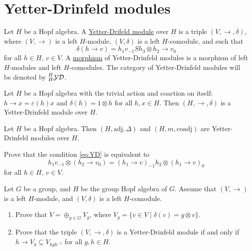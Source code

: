 \section{Yetter-Drinfeld modules}

\begin{definition}
Let $H$ be a Hopf algebra. A \underline{Yetter-Drifeld module} over $H$ is a
triple $(V,\rightarrow,\delta)$, where $(V,\rightarrow)$ is a left $H$-module,
$(V,\delta)$ is a left $H$-comodule, and such that 
\begin{equation}
\delta(h\rightarrow v)=h_{1}v_{-1}Sh_{3}\otimes h_{2}\rightarrow v_{0}\label{eq:YD}
\end{equation}
for all $h\in H$, $v\in V$. A \underline{morphism} of Yetter-Drinfeld modules
is a morphism of left $H$-modules and left $H$-comodules. The category of Yetter-Drinfeld
modules will be denoted by $\prescript{H}{H}{\mathcal{YD}}$.
\end{definition}

\begin{example}
Let $H$ be a Hopf algebra with the trivial action and coaction on itself:
$h\rightarrow x=\varepsilon(h)x$ and $\delta(h)=1\otimes h$ for all $h,x\in H$.
Then $(H,\rightarrow,\delta)$ is a Yetter-Drinfeld module over $H$.
\end{example}

\begin{example}
Let $H$ be a Hopf algebra. Then $(H,\mathrm{adj},\Delta)$ and
$(H,m,\mathrm{coadj})$ are Yetter-Drinfeld modules over $H$.
\end{example}

\begin{exercise}
\label{exercise:YD_condition}
Prove that the condition \eqref{eq:YD} is equivalent to
\begin{equation}
\label{eq:left_left_YD_equivalent}
h_{1}v_{-1}\otimes(h_{2}\rightarrow v_{0})=(h_{1}\rightarrow v)_{-1}h_{2}\otimes(h_{1}\rightarrow v)_{0}
\end{equation}
for all $h\in H$, $v\in V$.
\end{exercise}

\begin{exercise}
Let $G$ be a group, and $H$ be the group Hopf algebra of $G$. Assume that
$(V,\rightarrow)$ is a left $H$-module, and $(V,\delta)$ is a left
$H$-comodule. 
\begin{enumerate}
\item Prove that $V=\oplus_{g\in G}V_{g}$, where $V_{g}=\{v\in V\mid\delta(v)=g\otimes v\}$.  
\item Prove that the triple $(V,\rightarrow,\delta)$ is a Yetter-Drinfeld
module if and only if $h\rightarrow V_{g}\subseteq V_{hgh^{-1}}$ for all
$g,h\in H$.
\end{enumerate}
\end{exercise}

